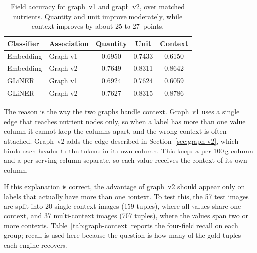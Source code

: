 \begin{table}[htbp]
  \centering
  \caption[Graph v1 versus graph v2: field accuracy]{Field accuracy for
    graph~v1 and graph~v2, over matched nutrients. Quantity and unit
    improve moderately, while context improves by about 25 to 27~points.}
  \label{tab:graph-fields}
  \small
  \begin{tabular}{@{}llccc@{}}
    \toprule
    \textbf{Classifier} & \textbf{Association} & \textbf{Quantity} & \textbf{Unit} & \textbf{Context} \\
    \midrule
    Embedding & Graph v1 & 0.6950 & 0.7433 & 0.6150 \\
    Embedding & Graph v2 & 0.7649 & 0.8311 & 0.8642 \\
    \addlinespace
    GLiNER    & Graph v1 & 0.6924 & 0.7624 & 0.6059 \\
    GLiNER    & Graph v2 & 0.7627 & 0.8315 & 0.8786 \\
    \bottomrule
  \end{tabular}
\end{table}



The reason is the way the two graphs handle context. Graph~v1 uses a single
 edge that reaches nutrient nodes only, so when a label
has more than one value column it cannot keep the columns apart, and the
wrong context is often attached. Graph~v2 adds the  edge
described in Section~\ref{sec:graph-v2}, which binds each header to the
tokens in its own column. This keeps a per-100\,g column and a per-serving
column separate, so each value receives the context of its own column.

If this explanation is correct, the advantage of graph~v2 should appear
only on labels that actually have more than one context. To test this, the
57 test images are split into 20 single-context images (159 tuples), where
all values share one context, and 37 multi-context images (707 tuples),
where the values span two or more contexts. Table~\ref{tab:graph-context}
reports the four-field recall on each group; recall is used here because
the question is how many of the gold tuples each engine recovers.




